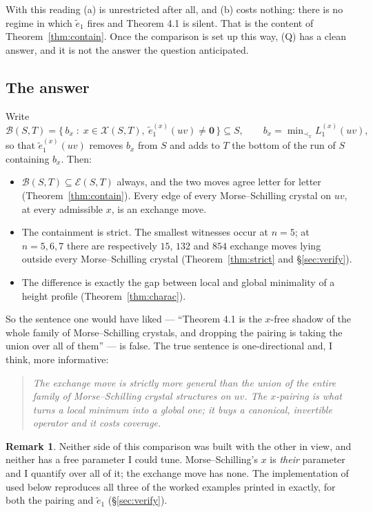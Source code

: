 \documentclass[11pt]{article}
\theoremstyle{definition}
\newtheorem{rem}[thm]{Remark}
\newcommand{\et}{\tilde e_1}
\newcommand{\XX}{\mathcal{X}}
\newcommand{\EE}{\mathcal{E}}
\newcommand{\BB}{\mathcal{B}}
\begin{document}
With this reading (a) is unrestricted after all, and (b) costs nothing: there is no regime in
which $\et$ fires and Theorem 4.1 is silent. That is the content of Theorem~\ref{thm:contain}.
Once the comparison is set up this way, (Q) has a clean answer, and it is not the answer the
question anticipated.

\subsection{The answer}

Write
\[
  \BB(S,T)=\bigl\{\,b_x \;:\; x\in\XX(S,T),\ \et^{(x)}(uv)\neq\mathbf 0\,\bigr\}\subseteq S,
  \qquad b_x=\min\nolimits_{\prec_x} L_1^{(x)}(uv),
\]
so that $\et^{(x)}(uv)$ removes $b_x$ from $S$ and adds to $T$ the bottom of the run of $S$
containing $b_x$. Then:

\begin{itemize}
\item $\BB(S,T)\subseteq\EE(S,T)$ always, and the two moves agree letter for letter
(Theorem~\ref{thm:contain}). Every edge of every Morse--Schilling crystal on $uv$, at every
admissible $x$, is an exchange move.
\item The containment is strict. The smallest witnesses occur at $n=5$; at $n=5,6,7$ there are
respectively $15$, $132$ and $854$ exchange moves lying outside every Morse--Schilling crystal
(Theorem~\ref{thm:strict} and \S\ref{sec:verify}).
\item The difference is exactly the gap between local and global minimality of a height
profile (Theorem~\ref{thm:charac}).
\end{itemize}

So the sentence one would have liked --- ``Theorem 4.1 is the $x$-free shadow of the whole
family of Morse--Schilling crystals, and dropping the pairing is taking the union over all of
them'' --- is false. The true sentence is one-directional and, I think, more informative:

\begin{quote}
\emph{The exchange move is strictly more general than the union of the entire family of
Morse--Schilling crystal structures on $uv$. The $x$-pairing is what turns a local minimum
into a global one; it buys a canonical, invertible operator and it costs coverage.}
\end{quote}

\begin{rem}
Neither side of this comparison was built with the other in view, and neither has a free
parameter I could tune. Morse--Schilling's $x$ is \emph{their} parameter and I quantify over
all of it; the exchange move has none. The implementation of \cite[Def.~\texttt{crystal operators}]{MS} used
below reproduces all three of the worked examples printed in \cite{MS} exactly, for both the
pairing and $\et$ (\S\ref{sec:verify}).
\end{rem}
\end{document}
